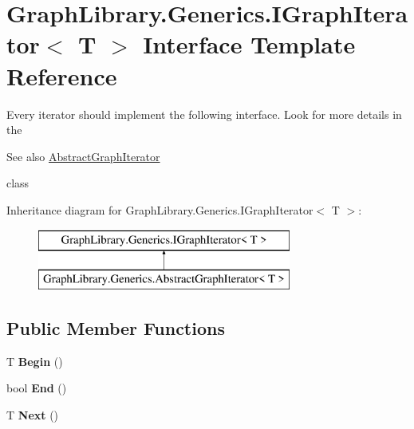\hypertarget{interface_graph_library_1_1_generics_1_1_i_graph_iterator}{}\section{Graph\+Library.\+Generics.\+I\+Graph\+Iterator$<$ T $>$ Interface Template Reference}
\label{interface_graph_library_1_1_generics_1_1_i_graph_iterator}


Every iterator should implement the following interface. Look for more details in the \begin{DoxySeeAlso}{See also}
\hyperlink{class_graph_library_1_1_generics_1_1_abstract_graph_iterator}{Abstract\+Graph\+Iterator}


\end{DoxySeeAlso}
class  


Inheritance diagram for Graph\+Library.\+Generics.\+I\+Graph\+Iterator$<$ T $>$\+:\begin{figure}[H]
\begin{center}
\leavevmode
\includegraphics[height=2.000000cm]{interface_graph_library_1_1_generics_1_1_i_graph_iterator}
\end{center}
\end{figure}
\subsection*{Public Member Functions}
\begin{DoxyCompactItemize}
\item 
\hypertarget{interface_graph_library_1_1_generics_1_1_i_graph_iterator_ac05f3892ce9ada56e29b97af0a16b624}{}T {\bfseries Begin} ()\label{interface_graph_library_1_1_generics_1_1_i_graph_iterator_ac05f3892ce9ada56e29b97af0a16b624}

\item 
\hypertarget{interface_graph_library_1_1_generics_1_1_i_graph_iterator_a07079326b0d3a2fc539357140321f2fe}{}bool {\bfseries End} ()\label{interface_graph_library_1_1_generics_1_1_i_graph_iterator_a07079326b0d3a2fc539357140321f2fe}

\item 
\hypertarget{interface_graph_library_1_1_generics_1_1_i_graph_iterator_ad3b9494de0793a30b5ac5678f769e000}{}T {\bfseries Next} ()\label{interface_graph_library_1_1_generics_1_1_i_graph_iterator_ad3b9494de0793a30b5ac5678f769e000}

\end{DoxyCompactItemize}


